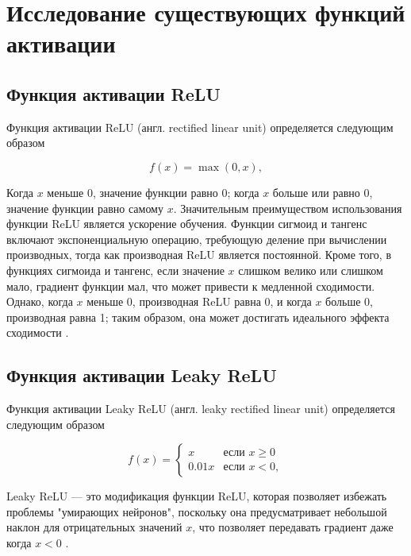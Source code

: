 \chapter{Исследование существующих функций активации}

\section {Функция активации ReLU}
	Функция активации ReLU (англ. rectified linear unit) определяется следующим образом

	\begin{equation}
		f(x) = \max(0, x),
	\end{equation}
	
	Когда \( x \) меньше 0, значение функции равно 0; когда \( x \) больше или равно 0, значение функции равно самому \( x \). Значительным преимуществом использования функции ReLU является ускорение обучения. Функции сигмоид и тангенс включают экспоненциальную операцию, требующую деление при вычислении производных, тогда как производная ReLU является постоянной. Кроме того, в функциях сигмоида и тангенс, если значение \( x \) слишком велико или слишком мало, градиент функции мал, что может привести к медленной сходимости. Однако, когда \( x \) меньше 0, производная ReLU равна 0, и когда \( x \) больше 0, производная равна 1; таким образом, она может достигать идеального эффекта сходимости \cite{survey}.
	
		
	
	
\section {Функция активации Leaky ReLU}
	Функция активации Leaky ReLU (англ. leaky rectified linear unit) определяется следующим образом

	\begin{equation}
		f(x) = \begin{cases} 
			x & \text{если } x \geq 0 \\
			0.01x & \text{если } x < 0,
		\end{cases}
	\end{equation}
	
	Leaky ReLU — это модификация функции ReLU, которая позволяет избежать проблемы "умирающих нейронов", поскольку она предусматривает небольшой наклон для отрицательных значений \(x\), что позволяет передавать градиент даже когда \(x < 0\) \cite{recursive}.
	
